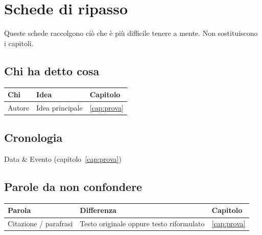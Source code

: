 \chapter{Schede di ripasso}

Queste schede raccolgono ciò che è più difficile tenere a mente. Non sostituiscono i capitoli.

\section*{Chi ha detto cosa}

\begin{tabularx}{\linewidth}{@{}lYl@{}}
\toprule
\textbf{Chi} & \textbf{Idea} & \textbf{Capitolo} \\
\midrule
Autore & Idea principale & \ref{cap:prova} \\
\bottomrule
\end{tabularx}

\section*{Cronologia}

\begin{cronologia}
Data & Evento (capitolo~\ref{cap:prova}) \\
\end{cronologia}

\section*{Parole da non confondere}

\begin{tabularx}{\linewidth}{@{}YYl@{}}
\toprule
\textbf{Parola} & \textbf{Differenza} & \textbf{Capitolo} \\
\midrule
Citazione / parafrasi & Testo originale oppure testo riformulato & \ref{cap:prova} \\
\bottomrule
\end{tabularx}
